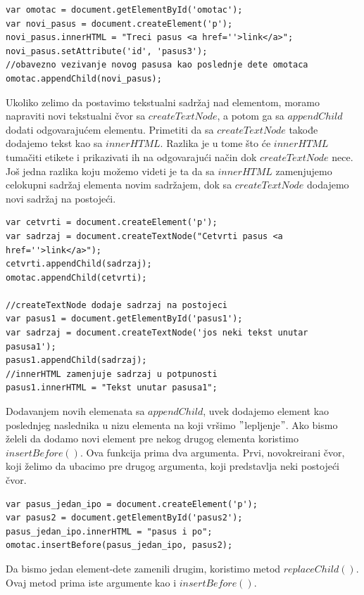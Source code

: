 \documentclass[a4paper]{article}
\begin{document}
\begin{lstlisting}[backgroundcolor = \color{lightgray}]
var omotac = document.getElementById('omotac');
var novi_pasus = document.createElement('p');
novi_pasus.innerHTML = "Treci pasus <a href=''>link</a>";
novi_pasus.setAttribute('id', 'pasus3');
//obavezno vezivanje novog pasusa kao poslednje dete omotaca
omotac.appendChild(novi_pasus);
\end{lstlisting}

Ukoliko zelimo da postavimo tekstualni sadržaj nad elementom, moramo napraviti novi tekstualni čvor sa $createTextNode$, a potom ga sa $appendChild$ dodati odgovarajućem elementu. Primetiti da sa $createTextNode$ takođe dodajemo tekst kao sa $innerHTML$. Razlika je u tome što će $innerHTML$ tumačiti etikete i prikazivati ih na odgovarajući način dok $createTextNode$ nece. Još jedna razlika koju možemo videti je ta da sa $innerHTML$ zamenjujemo celokupni sadržaj elementa novim sadržajem, dok sa $createTextNode$ dodajemo novi sadržaj na postojeći.

\begin{lstlisting}[backgroundcolor = \color{lightgray}]
var cetvrti = document.createElement('p');
var sadrzaj = document.createTextNode("Cetvrti pasus <a href=''>link</a>");
cetvrti.appendChild(sadrzaj);
omotac.appendChild(cetvrti);

//createTextNode dodaje sadrzaj na postojeci
var pasus1 = document.getElementById('pasus1');
var sadrzaj = document.createTextNode('jos neki tekst unutar pasusa1');
pasus1.appendChild(sadrzaj);
//innerHTML zamenjuje sadrzaj u potpunosti
pasus1.innerHTML = "Tekst unutar pasusa1";
\end{lstlisting}

Dodavanjem novih elemenata sa $appendChild$, uvek dodajemo element kao poslednjeg naslednika u nizu elementa na koji vršimo $"$lepljenje$"$. Ako bismo želeli da dodamo novi element pre nekog drugog elementa koristimo $insertBefore()$. Ova funkcija prima dva argumenta. Prvi, novokreirani čvor, koji želimo da ubacimo pre drugog argumenta, koji predstavlja neki postojeći čvor. 
\begin{lstlisting}[backgroundcolor = \color{lightgray}]
var pasus_jedan_ipo = document.createElement('p');
var pasus2 = document.getElementById('pasus2');
pasus_jedan_ipo.innerHTML = "pasus i po";
omotac.insertBefore(pasus_jedan_ipo, pasus2);
\end{lstlisting}

Da bismo jedan element-dete zamenili drugim, koristimo metod $replaceChild()$. Ovaj metod prima iste argumente kao i $insertBefore()$.
\end{document}
